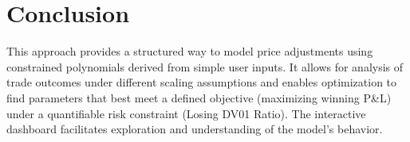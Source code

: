 \documentclass[11pt, a4paper]{article}
\begin{document}
\section*{Conclusion}
This approach provides a structured way to model price adjustments using constrained polynomials derived from simple user inputs. It allows for analysis of trade outcomes under different scaling assumptions and enables optimization to find parameters that best meet a defined objective (maximizing winning P\&L) under a quantifiable risk constraint (Losing DV01 Ratio). The interactive dashboard facilitates exploration and understanding of the model's behavior.
\end{document}

